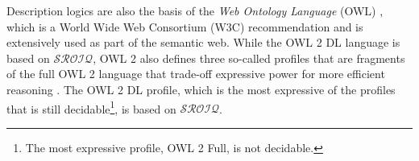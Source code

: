 
Description logics are also the basis of the \emph{Web Ontology Language} (OWL) \cite{hitzler2012primer,motik2012ontology}, which is a World Wide Web Consortium (W3C) recommendation and is extensively used as part of the semantic web. While the OWL 2 DL language is based on $\mathcal{SROIQ}$, OWL 2 also defines three so-called profiles that are fragments of the full OWL 2 language that trade-off expressive power for more efficient reasoning \cite{motik2012profiles,motik2012ontology}. The OWL 2 DL profile, which is the most expressive of the profiles that is still decidable\footnote{The most expressive profile, OWL 2 Full, is not decidable.}, is based on $\mathcal{SROIQ}$.


